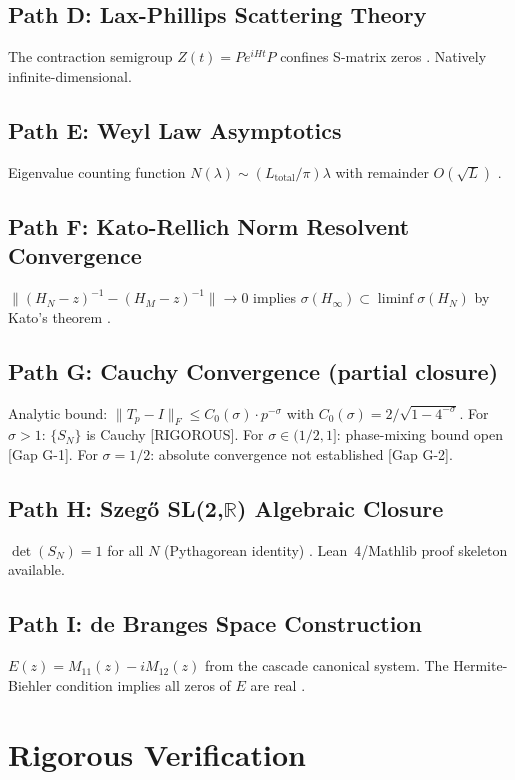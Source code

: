 \documentclass[11pt,reqno]{amsart}
\begin{document}
\subsection{Path D: Lax-Phillips Scattering Theory}
The contraction semigroup $Z(t) = P e^{iHt} P$ confines S-matrix zeros
\cite{lax-phillips67}.  Natively infinite-dimensional.

\subsection{Path E: Weyl Law Asymptotics}
Eigenvalue counting function $N(\lambda) \sim (L_{\mathrm{total}}/\pi)\lambda$
with remainder $O(\sqrt{L})$ \cite{reed-simon78}.

\subsection{Path F: Kato-Rellich Norm Resolvent Convergence}
$\|(H_N - z)^{-1} - (H_M - z)^{-1}\| \to 0$ implies
$\sigma(H_\infty) \subset \liminf \sigma(H_N)$ by Kato's theorem \cite{kato66}.

\subsection{Path G: Cauchy Convergence (partial closure)}
Analytic bound: $\|T_p - I\|_F \leq C_0(\sigma)\cdot p^{-\sigma}$
with $C_0(\sigma) = 2/\sqrt{1 - 4^{-\sigma}}$.
For $\sigma > 1$: $\{S_N\}$ is Cauchy [RIGOROUS].
For $\sigma \in (1/2, 1]$: phase-mixing bound open [Gap G-1].
For $\sigma = 1/2$: absolute convergence not established [Gap G-2].

\subsection{Path H: Szeg\H{o} SL(2,$\mathbb{R}$) Algebraic Closure}
$\det(S_N) = 1$ for all $N$ (Pythagorean identity) \cite{simon05}.
Lean~4/Mathlib proof skeleton available.

\subsection{Path I: de Branges Space Construction}
$E(z) = M_{11}(z) - iM_{12}(z)$ from the cascade canonical system.
The Hermite-Biehler condition implies all zeros of $E$ are real
\cite{debranges68}.

\section{Rigorous Verification}
\end{document}
